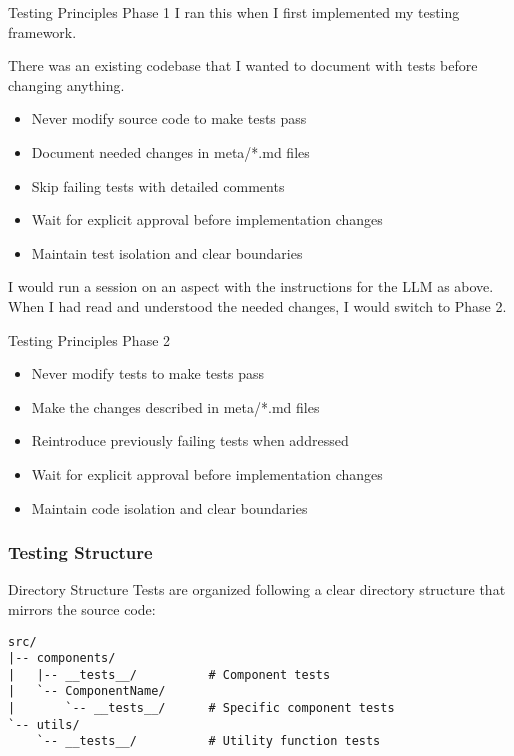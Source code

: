 \documentclass{beamer}
\begin{document}
\begin{frame}  
    \begin{block}{Testing Principles Phase 1}
        I ran this when I first implemented my testing framework.
        
        There was an existing codebase that I wanted to document with tests before changing anything. 
        
        \begin{itemize}
            \item Never modify source code to make tests pass
            \item Document needed changes in meta/*.md files
            \item Skip failing tests with detailed comments
            \item Wait for explicit approval before implementation changes
            \item Maintain test isolation and clear boundaries
        \end{itemize}
    \end{block}
    \vspace{0.5cm}
    I would run a session on an aspect with the instructions for the LLM as above. When I had read and understood the needed changes, I would switch to Phase 2. \pause
\end{frame}

\begin{frame}
    \begin{block}{Testing Principles Phase 2}
    \begin{itemize}
        \item Never modify tests to make tests pass
        \item Make the changes described in meta/*.md files
        \item Reintroduce previously failing tests when addressed 
        \item Wait for explicit approval before implementation changes
        \item Maintain code isolation and clear boundaries
    \end{itemize}
\end{block}
\end{frame}

\begin{frame}[fragile]
    \frametitle{Testing Structure}
    \begin{block}{Directory Structure}
        Tests are organized following a clear directory structure that mirrors the source code:
    \end{block}
    
    \begin{lstlisting}[basicstyle=\ttfamily\small]
src/
|-- components/
|   |-- __tests__/          # Component tests
|   `-- ComponentName/
|       `-- __tests__/      # Specific component tests
`-- utils/
    `-- __tests__/          # Utility function tests
    \end{lstlisting}
\end{frame}
\end{document}
